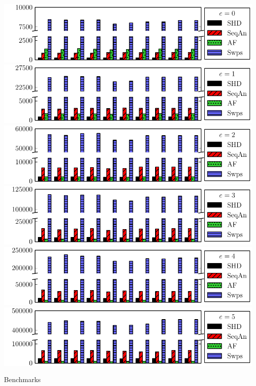 \documentclass[12pt]{standalone}
\begin{document}
\large
\pagestyle{empty}
\begin{minipage}{17.75cm}
\noindent
\includegraphics{0_errors.pdf}\break
\noindent
\vspace{-.65cm}\break
\includegraphics{1_errors.pdf}\break
\noindent
\vspace{-.65cm}\break
\includegraphics{2_errors.pdf}\break
\noindent
\vspace{-.65cm}\break
\includegraphics{3_errors.pdf}\break
\noindent
\vspace{-.65cm}\break
\includegraphics{4_errors.pdf}\break
\noindent
\vspace{-.65cm}\break
\includegraphics{5_errors.pdf}
\noindent
{}
\vspace{-1.1cm}
\begin{center} \parbox{4.75cm}{\small Benchmarks} \end{center}
\end{minipage}
\end{document}
